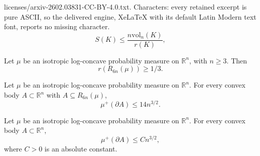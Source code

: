 \documentclass[10pt,a4paper]{amsart}
\newcommand{\gr}{\geqslant}
\newcommand{\ls}{\leqslant}
\newcommand{\vol}{\mathrm{vol}}
\begin{document}
licenses/arxiv-2602.03831-CC-BY-4.0.txt. Characters: every retained excerpt is pure ASCII, so the delivered engine, XeLaTeX with its default Latin Modern text font, reports no missing character.
\begin{equation}\label{eq:surface-inradius}
S(K)\ls\frac{n\vol_n(K)}{r(K)},
\end{equation}

\begin{lemma}\label{lem:inradius}
Let $\mu$ be an isotropic log-concave probability measure on $\mathbb{R}^n$, with $n\gr 3$. Then
$$r(R_{6n}(\mu))\gr 1/3.$$
\end{lemma}

\begin{corollary}\label{cor:perimeter-subset-Rn}Let $\mu$ be an isotropic log-concave probability measure on $\mathbb{R}^n$. For every  
convex body $A\subset\mathbb{R}^n$ with $A\subseteq R_{6n}(\mu)$, 
$$\mu^+(\partial A)\ls 14n^{3/2}.$$
\end{corollary}

\begin{theorem}\label{th:perimeter}Let $\mu$ be an isotropic log-concave probability measure on $\mathbb{R}^n$. For every  
convex body $A\subset\mathbb{R}^n$, 
$$\mu^+(\partial A)\ls Cn^{3/2},$$
where $C>0$ is an absolute constant.
\end{theorem}
\end{document}
